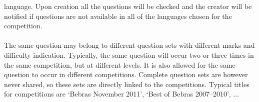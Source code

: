 \begin{section}
	language. Upon creation all the questions will be checked and the creator will be
	notified if questions are not available in all of the languages chosen for the
	competition.\\
	\\
	The same question may belong to different question sets with different marks and
	difficulty indication. Typically, the same question will occur two or three times in
	the same competition, but at different levels. It is also allowed for the same
	question to occur in different competitions. Complete question sets are however never
	shared, so these sets are directly linked to the competitions. Typical titles for
	competitions are ‘Bebras November 2011’, ‘Best of Bebras 2007–2010’, ...
	
\end{section}
